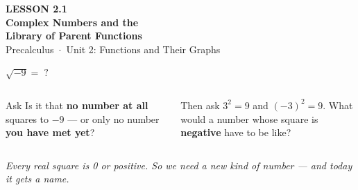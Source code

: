 \documentclass[aspectratio=169, 11pt]{beamer}
\begin{document}
{
\begin{frame}[plain]
  \vspace{2.8cm}\hspace{0.55cm}%
  \begin{minipage}{0.9\textwidth}
    {\color{goldacc}\bfseries\small LESSON 2.1}\\[0.5cm]
    {\color{white}\bfseries\LARGE Complex Numbers and the\\[4pt] Library of Parent Functions}\\[1.2cm]
    {\color{lilacmid}\small Precalculus~$\cdot$~Unit 2: Functions and Their Graphs}
  \end{minipage}
\end{frame}
}

\begin{frame}[t, plain]

  \begin{center}
    {\Huge\bfseries\color{plum} \(\sqrt{-9} = \;?\)}
  \end{center}

  \bigskip
  \begin{columns}[T]
      \begin{block}{Ask}
        Is it that \textbf{no number at all} squares to \(-9\) --- or only no number
        \textbf{you have met yet}?
      \end{block}
      \begin{block}{Then ask}
        \(3^2 = 9\) and \((-3)^2 = 9\). What would a number whose square is
        \textbf{negative} have to be like?
      \end{block}
  \end{columns}

  \bigskip
  \textit{Every real square is 0 or positive. So we need a new kind of number --- and today
  it gets a name.}
\end{frame}
\end{document}
